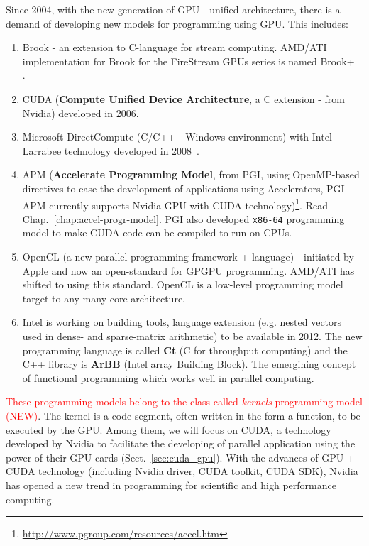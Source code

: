 Since 2004, with the new generation of GPU - unified architecture,
there is a demand of developing new models for programming using
GPU. This includes:
\begin{enumerate}
\item Brook - an extension to C-language for stream computing. AMD/ATI
  implementation for Brook for the FireStream GPUs series is named
  Brook+~\citep{buck2004brook} .

\item CUDA ({\bf Compute Unified Device Architecture}, a C extension -
  from Nvidia) developed in 2006.

\item Microsoft DirectCompute (C/C++ - Windows environment) with Intel
  Larrabee technology developed in 2008~\citep{seiler2008larrabee}. 

\item APM ({\bf Accelerate Programming Model}, from PGI, using
  OpenMP-based directives to ease the development of applications
  using Accelerators, PGI APM currently supports Nvidia GPU with CUDA
  technology)\footnote{\url{http://www.pgroup.com/resources/accel.htm}}. Read
  Chap.~\ref{chap:accel-progr-model}. PGI also developed \verb!x86-64!
  programming model to make CUDA code can be compiled to run on CPUs. 

\item OpenCL (a new parallel programming framework +
  language) - initiated by Apple and now an open-standard for GPGPU
  programming. AMD/ATI has shifted to using this standard. OpenCL is a
low-level programming model target to any many-core architecture.

\item Intel is working on building tools, language extension (e.g.
nested vectors used in dense- and sparse-matrix arithmetic) to be available in
2012. The new programming language is called {\bf Ct} (C for throughput
computing) and the C++ library is {\bf ArBB} (Intel array Building Block). The
emergining concept of functional programming which works well in parallel
computing. 
\end{enumerate}

\textcolor{red}{These programming models belong to the class called
  {\it kernels} programming model (NEW)}.
The kernel is a code segment, often written in the form a function, to be
executed by the GPU. Among them, we will focus on CUDA, a technology developed
by Nvidia to facilitate the developing of parallel application using the power
of their GPU cards (Sect.~\ref{sec:cuda_gpu}). With the advances of GPU + CUDA
technology (including Nvidia driver, CUDA toolkit, CUDA SDK), Nvidia has opened
a new trend in programming for scientific and high performance computing.

